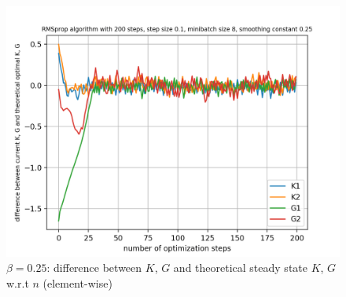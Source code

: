 \documentclass{article}
\begin{document}
\begin{figure}[h!]
\begin{minipage}[t]{.28\paperwidth}
		\includegraphics[width=1.0\textwidth]{Figures/d_beta_0_25_sep.png}
		\caption{$\beta = 0.25$: difference between $K$, $G$ and theoretical steady state $K$, $G$ w.r.t $n$ (element-wise) \label{fig:d_beta_0_25_sep}}
	\end{minipage}
\end{figure}
\end{document}
